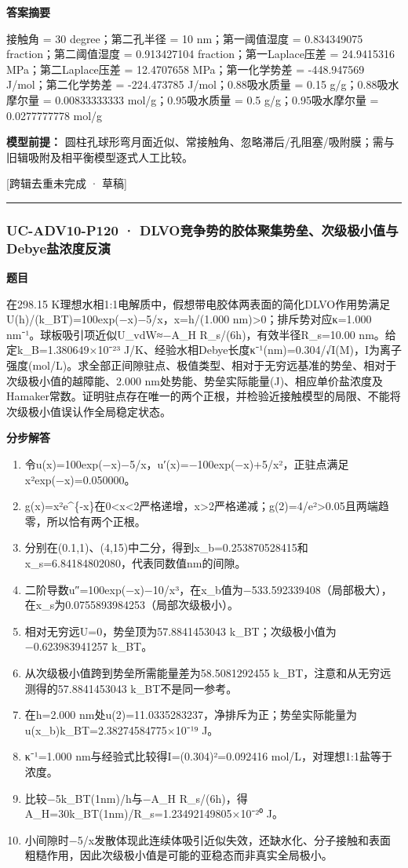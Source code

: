 \documentclass[UTF8,11pt,a4paper]{ctexart}
\begin{document}
\noindent\textbf{答案摘要}\par
接触角 = 30 degree；第二孔半径 = 10 nm；第一阈值湿度 = 0.834349075 fraction；第二阈值湿度 = 0.913427104 fraction；第一Laplace压差 = 24.9415316 MPa；第二Laplace压差 = 12.4707658 MPa；第一化学势差 = -448.947569 J/mol；第二化学势差 = -224.473785 J/mol；0.88吸水质量 = 0.15 g/g；0.88吸水摩尔量 = 0.00833333333 mol/g；0.95吸水质量 = 0.5 g/g；0.95吸水摩尔量 = 0.0277777778 mol/g\par
\noindent\textbf{模型前提：}
圆柱孔球形弯月面近似、常接触角、忽略滞后/孔阻塞/吸附膜；需与旧辑吸附及相平衡模型逐式人工比较。\par
\noindent\textcolor{red!65!black}{[跨辑去重未完成 · 草稿]} \par
\medskip\hrule\medskip
{}
\subsubsection*{UC-ADV10-P120 · DLVO竞争势的胶体聚集势垒、次级极小值与Debye盐浓度反演}
\noindent\textbf{题目}\par
在298.15 K理想水相1:1电解质中，假想带电胶体两表面的简化DLVO作用势满足U(h)/(k\_BT)=100exp(−x)−5/x，x=h/(1.000 nm)>0；排斥势对应κ=1.000 nm⁻¹。球板吸引项近似U\_vdW≈−A\_H R\_s/(6h)，有效半径R\_s=10.00 nm。给定k\_B=1.380649×10⁻²³ J/K、经验水相Debye长度κ⁻¹(nm)=0.304/√I(M)，I为离子强度(mol/L)。求全部正间隙驻点、极值类型、相对于无穷远基准的势垒、相对于次级极小值的越障能、2.000 nm处势能、势垒实际能量(J)、相应单价盐浓度及Hamaker常数。证明驻点存在唯一的两个正根，并检验近接触模型的局限、不能将次级极小值误认作全局稳定状态。\par
\medskip\noindent\textbf{分步解答}
\begin{enumerate}
\item 令u(x)=100exp(−x)−5/x，u′(x)=−100exp(−x)+5/x²，正驻点满足x²exp(−x)=0.050000。
\item g(x)=x²e\textasciicircum{}\{-x\}在0<x<2严格递增，x>2严格递减；g(2)=4/e²>0.05且两端趋零，所以恰有两个正根。
\item 分别在(0.1,1)、(4,15)中二分，得到x\_b=0.253870528415和x\_s=6.84184802080，代表同数值nm的间隙。
\item 二阶导数u″=100exp(−x)−10/x³，在x\_b值为−533.592339408（局部极大），在x\_s为0.0755893984253（局部次级极小）。
\item 相对无穷远U=0，势垒顶为57.8841453043 k\_BT；次级极小值为−0.623983941257 k\_BT。
\item 从次级极小值跨到势垒所需能量差为58.5081292455 k\_BT，注意和从无穷远测得的57.8841453043 k\_BT不是同一参考。
\item 在h=2.000 nm处u(2)=11.0335283237，净排斥为正；势垒实际能量为u(x\_b)k\_BT=2.38274584775×10⁻¹⁹ J。
\item κ⁻¹=1.000 nm与经验式比较得I=(0.304)²=0.092416 mol/L，对理想1:1盐等于浓度。
\item 比较−5k\_BT(1nm)/h与−A\_H R\_s/(6h)，得A\_H=30k\_BT(1nm)/R\_s=1.23492149805×10⁻²⁰ J。
\item 小间隙时−5/x发散体现此连续体吸引近似失效，还缺水化、分子接触和表面粗糙作用，因此次级极小值是可能的亚稳态而非真实全局极小。
\end{enumerate}
\end{document}

